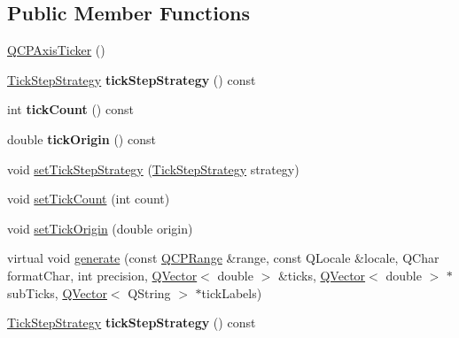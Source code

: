 \subsection*{Public Member Functions}
\begin{DoxyCompactItemize}
\item 
\hyperlink{class_q_c_p_axis_ticker_a8fcf23c79ebd72202fe79253f9f01ea8}{Q\+C\+P\+Axis\+Ticker} ()
\item 
\hyperlink{class_q_c_p_axis_ticker_ab6d2f9d9477821623ac9bc4b21ddf49a}{Tick\+Step\+Strategy} {\bfseries tick\+Step\+Strategy} () const \hypertarget{class_q_c_p_axis_ticker_adbde618e69fee8215e90aab20eb7fe88}{}\label{class_q_c_p_axis_ticker_adbde618e69fee8215e90aab20eb7fe88}

\item 
int {\bfseries tick\+Count} () const \hypertarget{class_q_c_p_axis_ticker_a860d9fbe9762abd19560b27b2b803f14}{}\label{class_q_c_p_axis_ticker_a860d9fbe9762abd19560b27b2b803f14}

\item 
double {\bfseries tick\+Origin} () const \hypertarget{class_q_c_p_axis_ticker_a521d8e0d3dc5b711bad3582c1473d333}{}\label{class_q_c_p_axis_ticker_a521d8e0d3dc5b711bad3582c1473d333}

\item 
void \hyperlink{class_q_c_p_axis_ticker_a73b1d847c1a12159af6bfda4ebebe7d5}{set\+Tick\+Step\+Strategy} (\hyperlink{class_q_c_p_axis_ticker_ab6d2f9d9477821623ac9bc4b21ddf49a}{Tick\+Step\+Strategy} strategy)
\item 
void \hyperlink{class_q_c_p_axis_ticker_a47752abba8293e6dc18491501ae34008}{set\+Tick\+Count} (int count)
\item 
void \hyperlink{class_q_c_p_axis_ticker_ab509c7e500293bf66a8409f0d7c23943}{set\+Tick\+Origin} (double origin)
\item 
virtual void \hyperlink{class_q_c_p_axis_ticker_aefbd11725678ca824add8cf926cbc856}{generate} (const \hyperlink{class_q_c_p_range}{Q\+C\+P\+Range} \&range, const Q\+Locale \&locale, Q\+Char format\+Char, int precision, \hyperlink{class_q_vector}{Q\+Vector}$<$ double $>$ \&ticks, \hyperlink{class_q_vector}{Q\+Vector}$<$ double $>$ $\ast$sub\+Ticks, \hyperlink{class_q_vector}{Q\+Vector}$<$ Q\+String $>$ $\ast$tick\+Labels)
\item 
\hyperlink{class_q_c_p_axis_ticker_ab6d2f9d9477821623ac9bc4b21ddf49a}{Tick\+Step\+Strategy} {\bfseries tick\+Step\+Strategy} () const \hypertarget{class_q_c_p_axis_ticker_adbde618e69fee8215e90aab20eb7fe88}{}\label{class_q_c_p_axis_ticker_adbde618e69fee8215e90aab20eb7fe88}


\end{DoxyCompactItemize}

